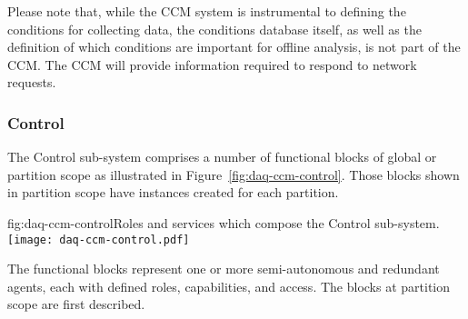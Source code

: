 Please note that, while the CCM system is instrumental to defining the conditions for collecting data, the conditions database itself, as well as the definition of which conditions are important for offline analysis, is not part of the CCM. The CCM will provide information required to respond to network requests.

\subsubsection{Control}
\label{sec:daq:design:ccm:control}

The  Control sub-system comprises a number of functional blocks of global or partition scope as illustrated in Figure~\ref{fig:daq-ccm-control}. 
Those blocks shown in partition scope have instances created for each partition. 


\begin{dunefigure}{fig:daq-ccm-control}{Roles and services which compose the  Control sub-system.}
  \texttt{[image: daq-ccm-control.pdf]}
\end{dunefigure}

The functional blocks represent one or more semi-autonomous and redundant agents, each with defined roles, capabilities, and access.  The blocks at partition scope are first described.


